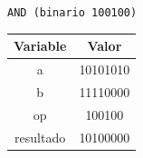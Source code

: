 \documentclass[letterpaper]{sae}
\begin{document}
\begin{figure}[H] %
\label{fig:test2}
\end{figure}

\verb+AND (binario 100100)+\\

\begin{center}
	\begin{tabular}{|c|c|}
		\hline 
		Variable & Valor\tabularnewline
		\hline 
		\hline 
		a & 10101010\tabularnewline
		\hline 
		b & 11110000\tabularnewline
		\hline 
		op & 100100\tabularnewline
		\hline 
		resultado & 10100000\tabularnewline
		\hline 
	\end{tabular}
\end{center}
\end{document}
